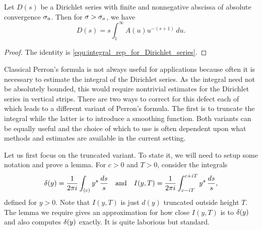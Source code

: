 \documentclass[12pt]{article}
\begin{document}
    \begin{corollary}\label{cor:integral_rep_for_Dirichlet_series}
      Let \(D(s)\) be a Dirichlet series with finite and nonnegative abscissa of absolute convergence \(\sigma_{a}\). Then for \(\sigma > \sigma_{a}\), we have
      \[
        D(s) = s\int_{1}^{\infty}A(u)u^{-(s+1)}\,du.
      \]
    \end{corollary}
    \begin{proof}
      The identity is \cref{equ:integral_rep_for_Dirichlet_series}.
    \end{proof}

    Classical Perron's formula is not always useful for applications because often it is necessary to estimate the integral of the Dirichlet series. As the integral need not be absolutely bounded, this would require nontrivial estimates for the Dirichlet series in vertical strips. There are two ways to correct for this defect each of which leads to a different variant of Perron's formula. The first is to truncate the integral while the latter is to introduce a smoothing function. Both variants can be equally useful and the choice of which to use is often dependent upon what methods and estimates are available in the current setting.
    
    Let us first focus on the truncated variant. To state it, we will need to setup some notation and prove a lemma. For \(c > 0\) and \(T > 0\), consider the integrals
    \[
      \delta(y) = \frac{1}{2\pi i}\int_{(c)}y^{s}\,\frac{ds}{s} \quad \text{and} \quad I(y,T) = \frac{1}{2\pi i}\int_{c-iT}^{c+iT}y^{s}\,\frac{ds}{s},
    \]
    defined for \(y > 0\). Note that \(I(y,T)\) is just \(d(y)\) truncated outside height \(T\). The lemma we require gives an approximation for how close \(I(y,T)\) is to \(\delta(y)\) and also computes \(\delta(y)\) exactly. It is quite laborious but standard.
\end{document}
